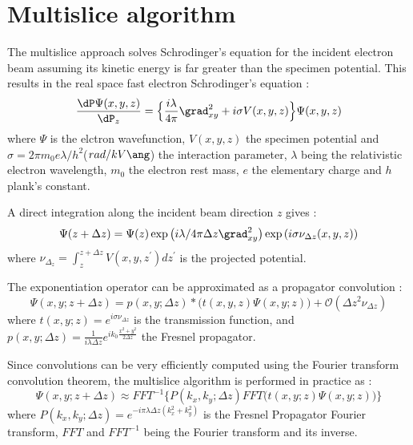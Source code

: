% 
% 

\section{Multislice algorithm}\label{chap:MS}

The multislice approach solves Schrodinger's equation for the incident electron beam assuming its kinetic energy is far greater than the specimen potential. This results in the real space fast electron Schrodinger's equation \cite{Kirkland2019}:
\begin{equation}\label{eq:FESE}
  \frac{\dP\Psi(x,y,z)}{\dP_z} =
    \Big\{\frac{i\lambda}{4\pi}\grad^2_{xy} + i\sigma V(x,y,z)\Big\} \Psi(x,y,z)
\end{equation}
where $\Psi$ is the elctron wavefunction,
$V(x,y,z)$ the specimen potential and
$\sigma=2\pi m_0e\lambda/h^2$($rad/kV\ang$) the interaction parameter, $\lambda$ being the relativistic electron wavelength, $m_0$ the electron rest mass, $e$ the elementary charge and $h$ plank's constant.

A direct integration along the incident beam direction $z$ gives :
\begin{equation}
  \Psi(z+\Delta z) = \Psi(z)
  \exp\left(i\lambda/4\pi\Delta z\grad^2_{xy}\right)
  \exp\left(i\sigma\nu_{\Delta z}(x,y,z)\right)
\end{equation}
where $\nu_{\Delta_z}=\int_z^{z+\Delta z}V(x,y,z^{'})dz^{'}$
is the projected potential.

The exponentiation operator can be approximated as a propagator convolution :
\begin{equation}\label{eq:MS_conv}
  \Psi(x,y;z+\Delta z) = p(x,y;\Delta z)\ast\Big(t(x,y,z)\Psi(x,y;z)\Big)
  +\mathcal O(\Delta z^2\nu_{\Delta z})
\end{equation}
where $t(x,y;z)=e^{i\sigma\nu_{\Delta z}}$ is the transmission function, and $p(x,y;\Delta z)=\frac{1}{i\lambda\Delta z}e^{ik_0\frac{x^2+y^2}{2\Delta z}}$ the Fresnel propagator.

Since convolutions can be very efficiently computed using the Fourier transform convolution theorem, the multislice algorithm is performed in practice as :
\begin{equation}\label{eq:MS_FFT}
  \Psi(x,y;z+\Delta z) \approx FFT^{-1}\Bigg\{
    P(k_x,k_y;\Delta z) FFT\Big(t(x,y;z)\Psi(x,y;z)\Big)
  \Bigg\}
\end{equation}
where $P(k_x,k_y;\Delta z)=e^{-i\pi\lambda\Delta z(k_x^2+k_y^2)}$ is the Fresnel Propagator Fourier transform, $FFT$ and $FFT^{-1}$ being the Fourier transform and its inverse.

